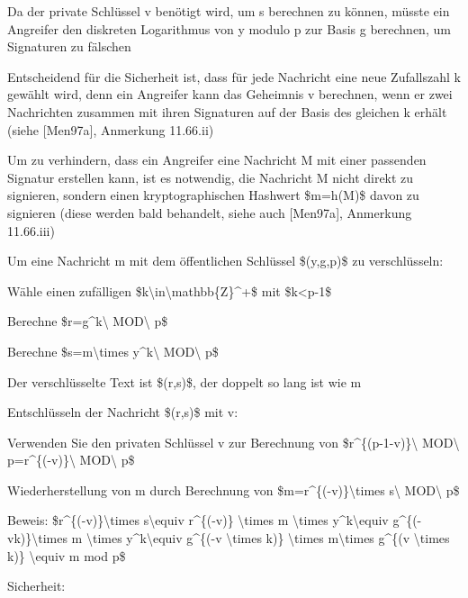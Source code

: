 \documentclass[a4paper]{article}
\begin{document}
\begin{multicols}{3}
\begin{itemize*}
            \begin{itemize*}
                  \item Da der private Schlüssel v benötigt wird, um s berechnen zu können, müsste ein Angreifer den diskreten Logarithmus von y modulo p zur Basis g berechnen, um Signaturen zu fälschen
                  \item Entscheidend für die Sicherheit ist, dass für jede Nachricht eine neue Zufallszahl k gewählt wird, denn ein Angreifer kann das Geheimnis v berechnen, wenn er zwei Nachrichten zusammen mit ihren Signaturen auf der Basis des gleichen k erhält (siehe {[}Men97a{]}, Anmerkung 11.66.ii)
                  \item Um zu verhindern, dass ein Angreifer eine Nachricht M mit einer passenden Signatur erstellen kann, ist es notwendig, die Nachricht M nicht direkt zu signieren, sondern einen kryptographischen Hashwert \$m=h(M)\$ davon zu signieren (diese werden bald behandelt, siehe auch {[}Men97a{]}, Anmerkung 11.66.iii)
            \end{itemize*}
            \item
            Um eine Nachricht m mit dem öffentlichen Schlüssel \$(y,g,p)\$ zu
            verschlüsseln:

            \begin{itemize*}
                  \item Wähle einen zufälligen \$k\textbackslash in\textbackslash mathbb\{Z\}\^{}+\$ mit \$k\textless p-1\$
                  \item Berechne \$r=g\^{}k\textbackslash{} MOD\textbackslash{} p\$
                  \item Berechne \$s=m\textbackslash times y\^{}k\textbackslash{} MOD\textbackslash{} p\$
                  \item Der verschlüsselte Text ist \$(r,s)\$, der doppelt so lang ist wie m
            \end{itemize*}
            \item
            Entschlüsseln der Nachricht \$(r,s)\$ mit v:

            \begin{itemize*}
                  \item Verwenden Sie den privaten Schlüssel v zur Berechnung von \$r\^{}\{(p-1-v)\}\textbackslash{} MOD\textbackslash{} p=r\^{}\{(-v)\}\textbackslash{} MOD\textbackslash{} p\$
                  \item Wiederherstellung von m durch Berechnung von \$m=r\^{}\{(-v)\}\textbackslash times s\textbackslash{} MOD\textbackslash{} p\$
                  \item Beweis: \$r\^{}\{(-v)\}\textbackslash times s\textbackslash equiv r\^{}\{(-v)\} \textbackslash times m \textbackslash times y\^{}k\textbackslash equiv g\^{}\{(-vk)\}\textbackslash times m \textbackslash times y\^{}k\textbackslash equiv g\^{}\{(-v \textbackslash times k)\} \textbackslash times m\textbackslash times g\^{}\{(v \textbackslash times k)\} \textbackslash equiv m mod p\$
            \end{itemize*}
            \item
            Sicherheit:


\end{itemize*}
\end{multicols}
\end{document}
